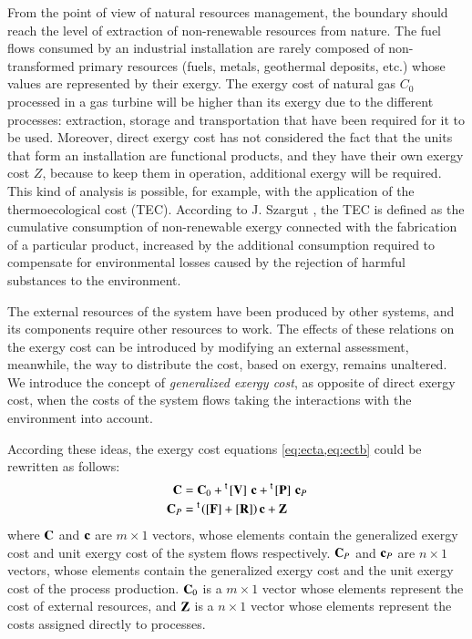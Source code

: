 \documentclass{ecos2018}
\begin{document}
From the point of view of natural resources management, the boundary should reach the level of extraction of non-renewable resources from nature. The fuel flows consumed by an industrial installation are rarely composed of non-transformed primary resources (fuels, metals, geothermal deposits, etc.) whose values are represented by their exergy. The exergy cost of natural gas $C_0$ processed in a gas turbine will be higher than its exergy due to the different processes: extraction, storage and transportation that have been required for it to be used.  Moreover, direct exergy cost has not considered the fact that the units that form an installation are functional products, and they have their own exergy cost $Z$, because to keep them in operation, additional exergy will be required.   
This kind of analysis is possible, for example, with the application of the thermoecological cost (TEC). According to J. Szargut \cite{Szargut2005}, the TEC is defined as the cumulative consumption of non-renewable exergy connected with the fabrication of a particular product, increased by the additional consumption required to compensate for environmental losses caused by the rejection of harmful substances to the environment.

The external resources of the system have been produced by other systems, and its components require other resources to work. The effects of these relations on the exergy cost can be introduced by modifying an external assessment, meanwhile, the way to distribute the cost, based on exergy, remains unaltered. We introduce the concept of \emph{generalized exergy cost}, as opposite of direct exergy cost, when the costs of the system flows taking the interactions with the environment into account.

According these ideas, the exergy cost equations \cref{eq:ecta,eq:ectb} could be rewritten as follows:
\begin{align}
\mathbf{C}&=\mathbf{C}_0+\prescript{\smash{\mathsf{t}}}{}{\mskip-1mu}\left[ \textbf{V} \right]\,\mathbf{c}+\prescript{\smash{\mathsf{t}}}{}{\mskip-1mu}\left[ \textbf{P} \right]\,\mathbf{c}_{P}\label{eq:gecta}\\
\mathbf{C}_{P}&=\prescript{\smash{\mathsf{t}}}{}{\mskip-1mu}\left([\mathbf{F}]+[\mathbf{R}]\right)\mathbf{c}+\mathbf{Z}\label{eq:gectb}
\end{align}
where $\mathbf{C}$ and $\mathbf{c}$ are $m\times 1$ vectors, whose elements contain the generalized exergy cost and unit exergy cost of the system flows respectively. $\mathbf{C}_{P}$ and $\mathbf{c}_{P}$ are $n \times1$ vectors, whose elements contain the generalized exergy cost and the unit exergy cost of the process production. $\mathbf{C}_0$ is a $m\times 1$ vector whose elements represent the cost of external resources, and $\mathbf{Z}$ is a $n\times 1$ vector whose elements represent the costs assigned directly to processes.
\end{document}
